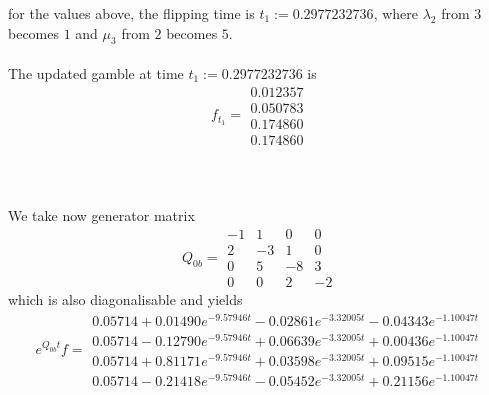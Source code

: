 \documentclass{article}
\begin{document}
for the values above, the flipping time is $t_{1}:= 0.2977232736$, where $\lambda_{2}$ from $3$ becomes $1$ and $\mu_{3}$ from $2$ becomes $5$.\\\\
The updated gamble at time $t_{1}:= 0.2977232736$ is
\begin{equation} \label{eq:ind_s2_4_f1} 
 f_{t_1}= 
 \begin{array}{|c|}
  0.012357\\
  0.050783\\
  0.174860\\
  0.174860  
 \end{array}
 \end{equation}\\\\\\
We take now generator matrix 
\begin{equation*} 
 Q_{0b}= 
 \begin{array}{|rrrr|}
  -1 & 1 & 0 & 0 \\
  2 & -3 & 1 & 0 \\
  0 & 5 & -8 & 3 \\
  0 & 0 & 2 & -2 
 \end{array}
 \end{equation*}
 which is also diagonalisable and yields
\begin{equation*} 
 e^{Q_{0b}t}f= 
 \begin{array}{|r|}
  0.05714+0.01490e^{-9.57946t}-0.02861e^{-3.32005t}-0.04343e^{-1.10047t}\\
  0.05714-0.12790e^{-9.57946t}+ 0.06639e^{-3.32005t}+ 0.00436e^{-1.10047t}\\
  0.05714+0.81171e^{-9.57946t}+ 0.03598e^{-3.32005t}+ 0.09515e^{-1.10047t}\\
  0.05714-0.21418e^{-9.57946t}- 0.05452e^{-3.32005t}+ 0.21156e^{-1.10047t}  
 \end{array}
 \end{equation*}
\end{document}
